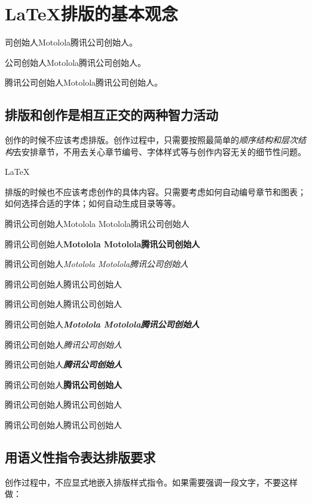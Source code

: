 \section{\LaTeX{}排版的基本观念}

\Warning{}司创始人Motolola腾讯公司创始人。

\Warning{}公司创始人Motolola腾讯公司创始人。

\Warning{}腾讯公司创始人Motolola腾讯公司创始人。

\subsection{排版和创作是相互正交的两种智力活动}
创作的时候不应该考虑排版。创作过程中，只需要按照最简单的\emph{顺序结构和层次结构}去安排章节，不用去关心章节编号、字体样式等与创作内容无关的细节性问题。

\LaTeX

排版的时候也不应该考虑创作的具体内容。只需要考虑如何自动编号章节和图表；如何选择合适的字体；如何自动生成目录等等。

\begingroup
腾讯公司创始人Motolola Motolola腾讯公司创始人

腾讯公司创始人\bfseries{Motolola Motolola}腾讯公司创始人

腾讯公司创始人\itshape{Motolola Motolola}腾讯公司创始人

腾讯公司创始人腾讯公司创始人

腾讯公司创始人腾讯公司创始人

腾讯公司创始人\bfseries\itshape{Motolola Motolola}腾讯公司创始人

腾讯公司创始人\itshape{}腾讯公司创始人

腾讯公司创始人\bfseries\itshape{}腾讯公司创始人

腾讯公司创始人\bfseries{}腾讯公司创始人

腾讯公司创始人腾讯公司创始人

腾讯公司创始人腾讯公司创始人
\endgroup

\subsection{用语义性指令表达排版要求}
\label{subsec:semantics}

创作过程中，不应显式地嵌入排版样式指令。如果需要强调一段文字，不要这样做：


